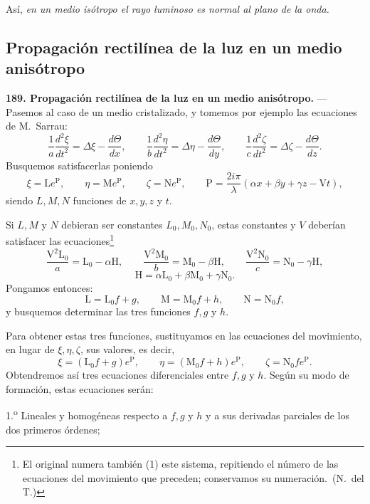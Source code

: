Así, \emph{en un medio isótropo el rayo luminoso es normal al plano de la
onda.}

\subsection{Propagación rectilínea de la luz en un medio anisótropo}

\noindent\textbf{189. Propagación rectilínea de la luz en un medio
anisótropo.} — Pasemos al caso de un medio cristalizado, y tomemos por
ejemplo las ecuaciones de M.~Sarrau:
\begin{equation}
\frac1a\frac{d^2\xi}{dt^2}=\Delta\xi-\frac{d\Theta}{dx},\qquad
\frac1b\frac{d^2\eta}{dt^2}=\Delta\eta-\frac{d\Theta}{dy},\qquad
\frac1c\frac{d^2\zeta}{dt^2}=\Delta\zeta-\frac{d\Theta}{dz}.
\tag{1}
\end{equation}
Busquemos satisfacerlas poniendo
\[
\xi=\mathrm Le^{\mathrm P},\qquad \eta=\mathrm Me^{\mathrm P},\qquad
\zeta=\mathrm Ne^{\mathrm P},\qquad
\mathrm P=\frac{2i\pi}{\lambda}(\alpha x+\beta y+\gamma z-\mathrm Vt),
\]
siendo $L,M,N$ funciones de $x,y,z$ y $t$.

Si $L,M$ y $N$ debieran ser constantes $L_0,M_0,N_0$, estas constantes y
$V$ deberían satisfacer las ecuaciones\footnote{El original numera
también (1) este sistema, repitiendo el número de las ecuaciones del
movimiento que preceden; conservamos su numeración.~(N.~del T.)}
\begin{equation}
\frac{\mathrm V^2\mathrm L_0}{a}=\mathrm L_0-\alpha\mathrm H,\qquad
\frac{\mathrm V^2\mathrm M_0}{b}=\mathrm M_0-\beta\mathrm H,\qquad
\frac{\mathrm V^2\mathrm N_0}{c}=\mathrm N_0-\gamma\mathrm H,
\tag{1}
\end{equation}
\[
\mathrm H=\alpha\mathrm L_0+\beta\mathrm M_0+\gamma\mathrm N_0.
\]
Pongamos entonces:
\[
\mathrm L=\mathrm L_0f+g,\qquad \mathrm M=\mathrm M_0f+h,\qquad \mathrm N=\mathrm N_0f,
\]
y busquemos determinar las tres funciones $f,g$ y $h$.

Para obtener estas tres funciones, sustituyamos en las ecuaciones del
movimiento, en lugar de $\xi,\eta,\zeta$, sus valores, es decir,
\[
\xi=(\mathrm L_0f+g)e^{\mathrm P},\qquad \eta=(\mathrm M_0f+h)e^{\mathrm P},\qquad \zeta=\mathrm N_0fe^{\mathrm P}.
\]
Obtendremos así tres ecuaciones diferenciales entre $f,g$ y $h$. Según su
modo de formación, estas ecuaciones serán:

1.\textsuperscript{o} Lineales y homogéneas respecto a $f,g$ y $h$ y a sus
derivadas parciales de los dos primeros órdenes;

